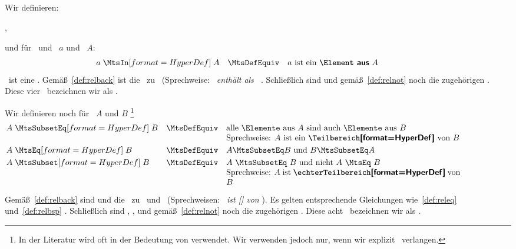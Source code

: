 \subsection[Bereiche]{\Bereiche}%
\label {sub:Bereiche}

Wir definieren:
\begin{description}
	\item[%
	,     ]                        
\end{description}
und für \Aussagen\ und \Objekte\ $a$ und \Bereiche\ $A$:
\begin{align}
	a \defSymBin{\MtsIn} A \quad \MtsDefEquiv \quad
	\text{$a$ ist ein \DefFt{\Element\ aus} $A$} \label{def:MtsIn}\formulatoleft
\end{align}
\MtsIn\ ist eine \Relation.
Gemäß~\eqref{def:relback}  ist  die \Umkehrrelationen\ zu \MtsIn\ (Sprechweise: \emph{\textdots\ enthält als \Element\ \textdots}.
Schließlich sind  und  gemäß~\eqref{def:relnot}  noch die zugehörigen \Negationen.
Diese vier \Relationen\ bezeichnen wir als .

Wir definieren noch für \Bereiche\ $A$ und $B$%
\footnote{%
	In der Literatur wird \chrqt{\MtsSubset} oft in der Bedeutung von \chrqt{\MtsSubsetEq} verwendet.
	Wir verwenden \chrqt{\MtsSubset} jedoch nur, wenn wir explizit \Ungleichheit\ verlangen.
}
\begin{align}
	& A \defSymBin{\MtsSubsetEq} B & \MtsDefEquiv \quad &
	\parbox[t]{10cm}{alle \Elemente\ aus $A$ sind auch \Elemente\ aus $B$
		\newline Sprechweise: $A$ ist ein \defTxt{\Teilbereich} von $B$}
	\label{def:MtsSubeq} \\
	& A \defSymBin{\MtsEq}       B & \MtsDefEquiv \quad &
	A \MtsSubsetEq B \text{ und } B \MtsSubsetEq A
	\label{def:MtsEq}    \\
	& A \defSymBin{\MtsSubset}   B & \MtsDefEquiv \quad &
	\parbox[t]{10cm}{$A$ \MtsSubsetEq $B$ und nicht $A$ \MtsEq $B$
		\newline Sprechweise: $A$ ist \defTxt{\echterTeilbereich} von $B$}
	\label{def:MtsSub}   \formulatoleft
\end{align}

Gemäß~\eqref{def:relback}  sind  und  die \Umkehrrelationen\ zu \MtsSubset\ und \MtsSubsetEq\ (Sprechweisen: \emph{\textdots\ ist []  von \textdots}).
Es gelten entsprechende Gleichungen wie~\eqref{def:releq} und~\eqref{def:relbsp} .
Schließlich sind , ,  und  gemäß~\eqref{def:relnot}  noch die zugehörigen \Negationen.
Diese acht \Relationen\ bezeichnen wir als .

